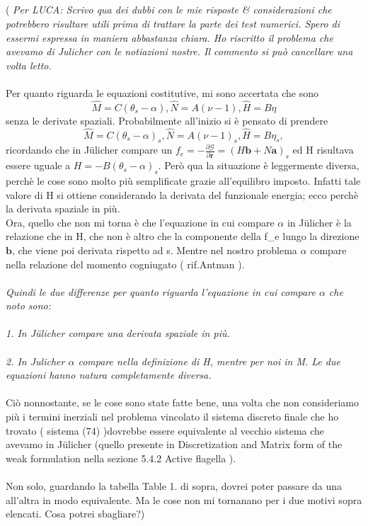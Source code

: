 \\\\\\\\
( \emph{Per LUCA: Scrivo qua dei dubbi con le mie risposte & considerazioni che potrebbero risultare utili prima di trattare la parte dei test numerici. Spero di essermi espressa in maniera abbastanza chiara. Ho riscritto il problema che avevamo di Julicher con le notiazioni nostre.
Il commento si può cancellare una volta letto.}
\\\\
Per quanto riguarda le equazioni costitutive, mi sono accertata che sono
\[ \hat{M} = C(\theta_s -\alpha), \hat{N} = A(\nu - 1), \hat{H} = B\eta \]
senza le derivate spaziali. Probabilmente all'inizio si è pensato di prendere 
\[ \hat{M} = C(\theta_s -\alpha)_s, \hat{N} = A(\nu - 1)_s, \hat{H} = B\eta _s, \] 
ricordando che in Jülicher compare un
$f_e = -\frac{\partial \mathcal{G}}{\partial \mathbf{r}} = (H \mathbf{b} + N \mathbf{a})_s$
ed H risultava essere uguale a $H = - B(\theta_s - \alpha)_s$. Però qua la situazione è leggermente diversa, perchè le cose sono molto più semplificate grazie all'equilibro imposto.
Infatti tale valore di H si ottiene considerando la derivata del funzionale energia; ecco perchè la derivata spaziale in più.\\
Ora, quello che non mi torna è che l'equazione in cui compare $\alpha$ in Jülicher è la relazione che in H, che non è altro che la componente della f_e lungo la direzione $\mathbf{b}$, che viene poi derivata rispetto ad s. Mentre nel nostro problema $\alpha$ compare nella relazione del momento cogniugato ( rif.Antman ).
\\\\
\emph{Quindi le due differenze per quanto riguarda l'equazione in cui compare $\alpha$ che noto sono:}
\\\\
\emph{1. In Jülicher compare una derivata spaziale in più.}
\\\\
\emph{2. In Julicher $\alpha$ compare nella definizione di H, mentre per noi in M. Le due equazioni hanno natura completamente diversa.}
\\\\
Ciò nonnostante, se le cose sono state fatte bene, una volta che non consideriamo più i termini inerziali nel problema vincolato il sistema discreto finale che ho trovato ( sistema (74) )dovrebbe essere equivalente al vecchio sistema che avevamo in Jülicher (quello presente in Discretization and Matrix form of the weak formulation nella sezione 5.4.2 Active flagella ).
\\\\
Non solo, guardando la tabella Table 1. di sopra, dovrei poter passare da una all'altra in modo equivalente. Ma le cose non mi tornanano per i due motivi sopra elencati. Cosa potrei sbagliare?) 




